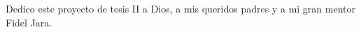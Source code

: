 
%
%
%

\begin{dedication}
    Dedico este proyecto de tesis II a Dios, a mis queridos padres
    y a mi gran mentor Fidel Jara.
\end{dedication}